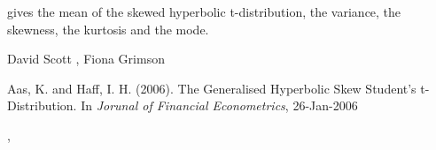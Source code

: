 \documentclass{book}
\begin{document}
\begin{Value}
 gives the mean of the skewed hyperbolic
t-distribution,  the variance,  the
skewness,  the kurtosis and  the
mode.
\end{Value}
\begin{Author}\relax
David Scott , Fiona Grimson
\end{Author}
\begin{References}\relax
Aas, K. and Haff, I. H. (2006).
The Generalised Hyperbolic Skew Student's t-Distribution.
In \emph{Jorunal of Financial Econometrics}, 26-Jan-2006
\end{References}
\begin{SeeAlso}\relax
{}, 
\end{SeeAlso}
\end{document}
